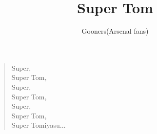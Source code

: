 \documentclass[a4paper,12pt]{article}
\title{Super Tom}
\author{Gooners(Arsenal fans)}
\date{}
\begin{document}
	
	\maketitle
	
	\begin{verse}
		
		Super, \\
		Super Tom, \\
		Super, \\
		Super Tom, \\
		Super, \\
		Super Tom, \\
		Super Tomiyasu$\ldots$
		
	\end{verse}
	
\end{document}
